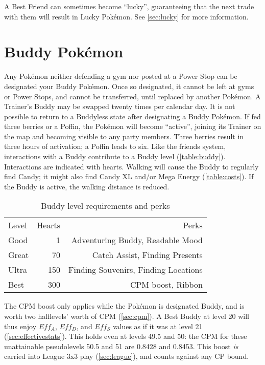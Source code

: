 A Best Friend can sometimes become ``lucky'', guaranteeing that the next trade with
  them will result in Lucky Pokémon.
See \autoref{sec:lucky} for more information.

\section{Buddy Pokémon}
\label{sec:buddies}
Any Pokémon neither defending a gym nor posted at a Power Stop can be designated your Buddy Pokémon.
Once so designated, it cannot be left at gyms or Power Stops, and cannot be transferred,
  until replaced by another Pokémon.
A Trainer's Buddy may be swapped twenty times per calendar day.
It is not possible to return to a Buddyless state after designating a Buddy Pokémon.
If fed three berries or a Poffin, the Pokémon will become ``active'',
  joining its Trainer on the map and becoming visible to any party members.
Three berries result in three hours of activation; a Poffin leads to six.
Like the friends system, interactions with a Buddy contribute to a Buddy level (\autoref{table:buddy}).
Interactions are indicated with hearts.
Walking will cause the Buddy to regularly find Candy; it might also find Candy XL
  and/or Mega Energy (\autoref{table:costs}).
If the Buddy is active, the walking distance is reduced.
\begin{table}
\centering
\begin{tabular}{lrr}
Level & Hearts & Perks\\
\Midrule
Good & 1 & Adventuring Buddy, Readable Mood\\
Great & 70 & Catch Assist, Finding Presents\\
Ultra & 150 & Finding Souvenirs, Finding Locations\\
Best & 300 & CPM boost, Ribbon\\
\end{tabular}
\caption{Buddy level requirements and perks}
\label{table:buddy}
\end{table}
The CPM boost only applies while the Pokémon is designated Buddy,
  and is worth two halflevels' worth of CPM (\autoref{sec:cpm}).
A Best Buddy at level 20 will thus enjoy $Eff_A$, $Eff_D$, and $Eff_S$ values
  as if it was at level 21 (\autoref{sec:effectivestats}).
This holds even at levels 49.5 and 50: the CPM for these unattainable
  pseudolevels 50.5 and 51 are 0.8428 and 0.8453.
This boost \textit{is} carried into League 3x3 play (\autoref{sec:league}),
  and counts against any CP bound.
